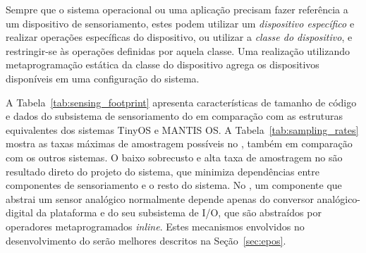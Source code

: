 Sempre que o sistema operacional ou uma aplicação precisam fazer referência a um
dispositivo de sensoriamento, estes podem utilizar um \emph{dispositivo
específico} e realizar operações específicas do dispositivo, ou utilizar a
\emph{classe do dispositivo}, e restringir-se às operações definidas por aquela
classe. Uma realização utilizando metaprogramação estática da classe do
dispositivo agrega os dispositivos disponíveis em uma configuração do sistema.



A Tabela~\ref{tab:sensing_footprint} apresenta características de tamanho de
código e dados do subsistema de sensoriamento do \epos em comparação com as estruturas
equivalentes dos sistemas TinyOS e MANTIS OS. A Tabela~\ref{tab:sampling_rates}
mostra as taxas máximas de amostragem possíveis no \epos, também em comparação
com os outros sistemas. O baixo sobrecusto e alta taxa de amostragem no \epos
são resultado direto do projeto do sistema, que minimiza dependências entre
componentes de sensoriamento e o resto do sistema. No \epos, um componente que
abstrai um sensor analógico normalmente depende apenas do conversor
analógico-digital da plataforma e do seu subsistema de I/O, que são abstraídos
por operadores metaprogramados \textit{inline}. Estes mecanismos envolvidos no
desenvolvimento do \epos serão melhores descritos na Seção~\ref{sec:epos}.

